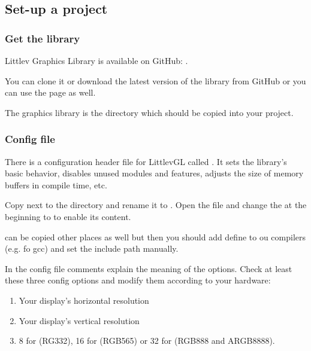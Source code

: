 \documentclass[letterpaper,10pt,english]{sphinxmanual}
\begin{document}
\subsection{Set-up a project}
\label{\detokenize{porting/project:set-up-a-project}}\label{\detokenize{porting/project::doc}}

\subsubsection{Get the library}
\label{\detokenize{porting/project:get-the-library}}
Littlev Graphics Library is available on GitHub: .

You can clone it or download the latest version of the library from GitHub or you can use the  page as well.

The graphics library is the  directory which should be copied into your project.


\subsubsection{Config file}
\label{\detokenize{porting/project:config-file}}
There is a configuration header file for LittlevGL called . It sets the library’s basic behavior, disables unused modules and features, adjusts the size of memory buffers in compile time, etc.

Copy  next to the  directory and rename it to . Open the file and change the  at the beginning to  to enable its content.

 can be copied other places as well but then you should add  define to ou compilers (e.g.  fo gcc) and set the include path manually.

In the config file comments explain the meaning of the options. Check at least these three config options and modify them according to your hardware:
\begin{enumerate}
\def\theenumi{\arabic{enumi}}
\def\labelenumi{\theenumi .}
\makeatletter\def\p@enumii{\p@enumi \theenumi .}\makeatother
\item {} 
 Your display’s horizontal resolution

\item {} 
 Your display’s vertical resolution

\item {} 
 8 for (RG332), 16 for (RGB565) or 32 for (RGB888 and ARGB8888).

\end{enumerate}
\end{document}
